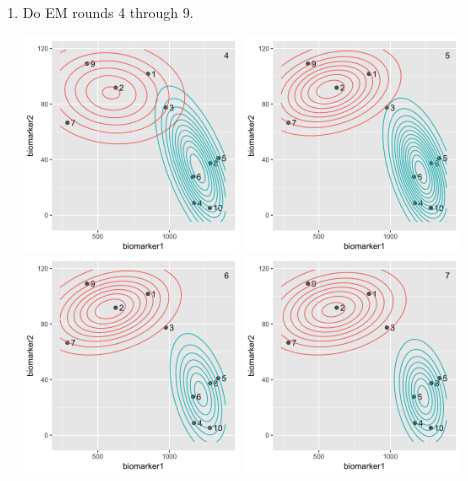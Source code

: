 \begin{enumerate}
\vspace{10mm}

\item Do EM rounds 4 through 9.

\begin{center}
\includegraphics[width=0.45\textwidth]{img/biomarker-data-labels-4.png}
\includegraphics[width=0.45\textwidth]{img/biomarker-data-labels-5.png}
\includegraphics[width=0.45\textwidth]{img/biomarker-data-labels-6.png}
\includegraphics[width=0.45\textwidth]{img/biomarker-data-labels-7.png}

\end{center}
\end{enumerate}
